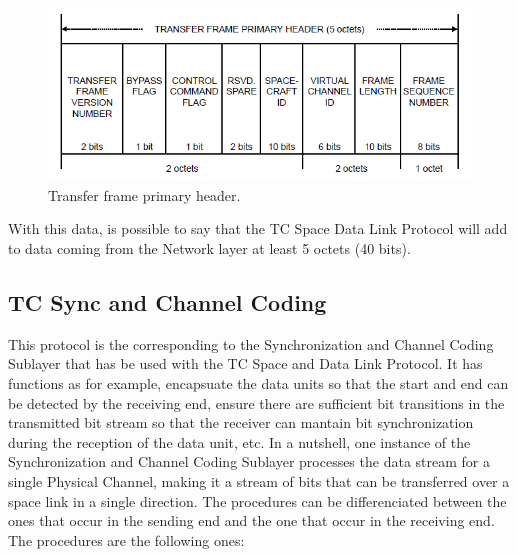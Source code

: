 \begin{figure}[H]
\begin{center}
\includegraphics[scale=0.8]{transferframeprimaryheader.PNG}   
\caption{Transfer frame primary header.}
\end{center}
\end{figure}

With this data, is possible to say that the TC Space Data Link Protocol will add to data coming from the Network layer at least 5 octets (40 bits).

\subsection{TC Sync and Channel Coding}
This protocol is the corresponding to the Synchronization and Channel Coding Sublayer that has be used with the TC Space and Data Link Protocol. It has functions as for example, encapsuate the data units so that the start and end can be detected by the receiving end, ensure there are sufficient bit transitions in the transmitted bit stream so that the receiver can mantain bit synchronization during the reception of the data unit, etc. In a nutshell, one instance of the Synchronization and Channel Coding Sublayer processes the data stream for a single Physical Channel, making it a stream of bits that can be transferred over a space link in a single direction. The procedures can be differenciated between the ones that occur in the sending end and the one that occur in the receiving end. The procedures are the following ones:

